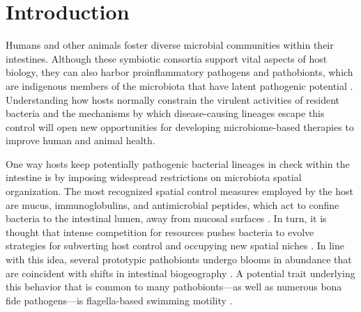 \section{Introduction}
Humans and other animals foster diverse microbial communities within their intestines. Although these symbiotic consortia support vital aspects of host biology, they can also harbor proinflammatory pathogens and pathobionts, which are indigenous members of the microbiota that have latent pathogenic potential \cite{chow_pathobionts_2011,hajishengallis_dancing_2016}. Understanding how hosts normally constrain the virulent activities of resident bacteria and the mechanisms by which disease-causing lineages escape this control will open new opportunities for developing microbiome-based therapies to improve human and animal health. 

One way hosts keep potentially pathogenic bacterial lineages in check within the intestine is by imposing widespread restrictions on microbiota spatial organization. The most recognized spatial control measures employed by the host are mucus, immunoglobulins, and antimicrobial peptides, which act to confine bacteria to the intestinal lumen, away from mucosal surfaces \cite{johansson_gastrointestinal_2013,cullender_innate_2013,vaishnava_antibacterial_2011}. In turn, it is thought that intense competition for resources pushes bacteria to evolve strategies for subverting host control and occupying new spatial niches \cite{finlay_common_1989,foster_evolution_2017}. In line with this idea, several prototypic pathobionts undergo blooms in abundance that are coincident with shifts in intestinal biogeography \cite{chow_pathobionts_2011,gevers_treatment-naive_2014,kostic_microbiome_2014,carvalho_transient_2012}. A potential trait underlying this behavior that is common to many pathobionts—as well as numerous bona fide pathogens—is flagella-based swimming motility \cite{elhenawy_host-specific_2019,ottemann_roles_1997,chaban_flagellum_2015}. 

